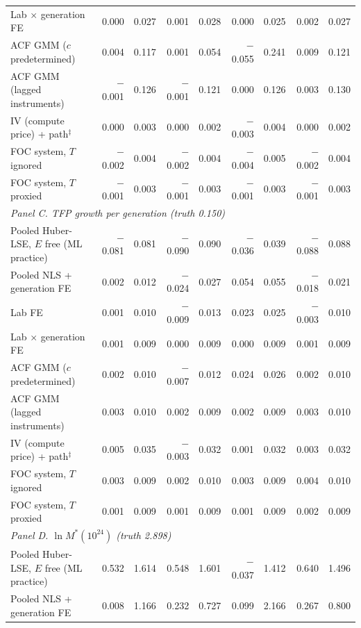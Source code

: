 \begin{table}[!htbp]
\begin{threeparttable}
\begin{tabular}{lrrrrrrrr}
Lab $\times$ generation FE & 0.000 & 0.027 & 0.001 & 0.028 & 0.000 & 0.025 & 0.002 & 0.027 \\
ACF GMM ($c$ predetermined) & 0.004 & 0.117 & 0.001 & 0.054 & $-$0.055 & 0.241 & 0.009 & 0.121 \\
ACF GMM (lagged instruments) & $-$0.001 & 0.126 & $-$0.001 & 0.121 & 0.000 & 0.126 & 0.003 & 0.130 \\
IV (compute price) + path$^{\ddagger}$ & 0.000 & 0.003 & 0.000 & 0.002 & $-$0.003 & 0.004 & 0.000 & 0.002 \\
FOC system, $T$ ignored & $-$0.002 & 0.004 & $-$0.002 & 0.004 & $-$0.004 & 0.005 & $-$0.002 & 0.004 \\
FOC system, $T$ proxied & $-$0.001 & 0.003 & $-$0.001 & 0.003 & $-$0.001 & 0.003 & $-$0.001 & 0.003 \\
\midrule
\multicolumn{9}{l}{\textit{Panel C. TFP growth per generation (truth 0.150)}} \\
Pooled Huber-LSE, $E$ free (ML practice) & $-$0.081 & 0.081 & $-$0.090 & 0.090 & $-$0.036 & 0.039 & $-$0.088 & 0.088 \\
Pooled NLS + generation FE & 0.002 & 0.012 & $-$0.024 & 0.027 & 0.054 & 0.055 & $-$0.018 & 0.021 \\
Lab FE & 0.001 & 0.010 & $-$0.009 & 0.013 & 0.023 & 0.025 & $-$0.003 & 0.010 \\
Lab $\times$ generation FE & 0.001 & 0.009 & 0.000 & 0.009 & 0.000 & 0.009 & 0.001 & 0.009 \\
ACF GMM ($c$ predetermined) & 0.002 & 0.010 & $-$0.007 & 0.012 & 0.024 & 0.026 & 0.002 & 0.010 \\
ACF GMM (lagged instruments) & 0.003 & 0.010 & 0.002 & 0.009 & 0.002 & 0.009 & 0.003 & 0.010 \\
IV (compute price) + path$^{\ddagger}$ & 0.005 & 0.035 & $-$0.003 & 0.032 & 0.001 & 0.032 & 0.003 & 0.032 \\
FOC system, $T$ ignored & 0.003 & 0.009 & 0.002 & 0.010 & 0.003 & 0.009 & 0.004 & 0.010 \\
FOC system, $T$ proxied & 0.001 & 0.009 & 0.001 & 0.009 & 0.001 & 0.009 & 0.002 & 0.009 \\
\midrule
\multicolumn{9}{l}{\textit{Panel D. $\ln M^*(10^{24})$ (truth 2.898)}} \\
Pooled Huber-LSE, $E$ free (ML practice) & 0.532 & 1.614 & 0.548 & 1.601 & $-$0.037 & 1.412 & 0.640 & 1.496 \\
Pooled NLS + generation FE & 0.008 & 1.166 & 0.232 & 0.727 & 0.099 & 2.166 & 0.267 & 0.800 \\

\end{tabular}
\end{threeparttable}
\end{table}
